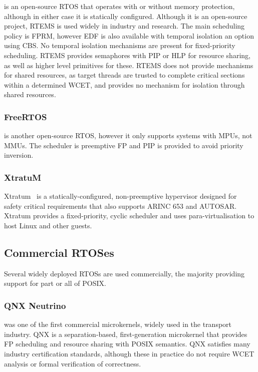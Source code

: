 \citet{RTEMS:URL} is an open-source \gls{RTOS} that operates with or without memory protection,
although in either case it is statically configured.  Although it is an open-source project, RTEMS
is used widely in industry and research.  The main scheduling policy is \gls{FPRM}, however
\gls{EDF} is also available with temporal isolation an option using \gls{CBS}.  No temporal
isolation mechanisms are present for fixed-priority scheduling.  RTEMS provides semaphores with
\gls{PIP} or \gls{HLP} for resource sharing, as well as higher level primitives for these. RTEMS
does not provide mechanisms for shared resources, as target threads are trusted to complete critical
sections within a determined \gls{WCET}, and provides no mechanism for isolation through shared
resources.

\subsubsection{FreeRTOS}

\citet{FreeRTOS:URL} is another open-source \gls{RTOS}, however it only supports systems with \glspl{MPU}, not
\glspl{MMU}. The scheduler is preemptive \gls{FP} and \gls{PIP} is provided to avoid priority inversion.

\subsubsection{XtratuM}

Xtratum~\citep{Masmano_RC_09} is a statically-configured, non-preemptive hypervisor designed for safety critical requirements that 
also supports ARINC 653 and AUTOSAR. Xtratum provides a fixed-priority, cyclic scheduler and uses
para-virtualisation to host Linux and other guests.

\subsection{Commercial RTOSes}

Several widely deployed \glspl{RTOS} are used commercially, the majority providing support for part or
all of \gls{POSIX}.  

\subsubsection{QNX Neutrino}

\citet{QNX_10} was one of the first commercial microkernels, widely used in the transport industry.
QNX is a separation-based, first-generation microkernel that provides
\gls{FP} scheduling and resource sharing with POSIX semantics.  QNX satisfies many industry
certification standards, although these in practice do not require {\gls{WCET}} analysis or formal
verification of correctness. 

